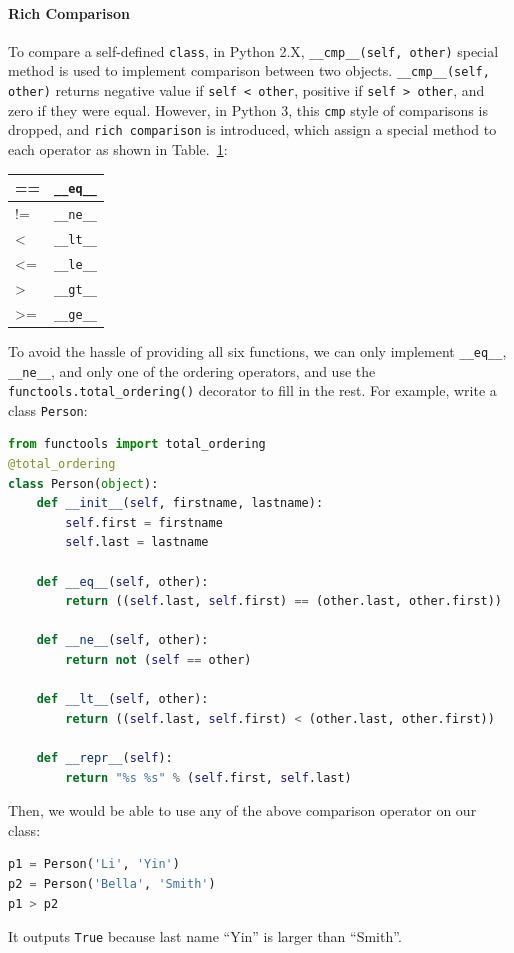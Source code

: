 \documentclass[../main.tex]{subfiles}
\begin{document}
\paragraph{Rich Comparison} To compare a self-defined \texttt{class}, in Python 2.X, \texttt{\_\_cmp\_\_(self, other)} special method is used to implement comparison between two objects. \texttt{\_\_cmp\_\_(self, other)} returns negative value if \texttt{self < other}, positive if \texttt{self > other}, and zero if they were equal. However, in Python 3, this \texttt{cmp} style of comparisons is dropped, and \texttt{rich comparison} is introduced, which assign a special method to each operator as shown in Table.~\ref{tab:comparison_operator_special_method}: 
\begin{table}[h]
\begin{small}
\centering
\noindent{}
 \noindent \begin{tabular}{|p{}|p{}|}
 \hline
== & \texttt{\_\_eq\_\_} \\ \hline
!= &\texttt{\_\_ne\_\_}\\ \hline
< 	& \texttt{\_\_lt\_\_}\\ \hline
<= &\texttt{\_\_le\_\_}\\ \hline
> 	& \texttt{\_\_gt\_\_}\\ \hline
>= 	& \texttt{\_\_ge\_\_}\\ \hline
\end{tabular}
  \label{tab:comparison_operator_special_method}
  \end{small}
\end{table} 
To avoid the hassle of providing all six functions, we can only implement \texttt{\_\_eq\_\_}, \texttt{\_\_ne\_\_}, and only one of the ordering operators, and use the \texttt{functools.total\_ordering()} decorator to fill in the rest. For example, write a class \texttt{Person}:
\begin{lstlisting}[language=Python]
from functools import total_ordering
@total_ordering
class Person(object):
    def __init__(self, firstname, lastname):
        self.first = firstname
        self.last = lastname

    def __eq__(self, other):
        return ((self.last, self.first) == (other.last, other.first))
        
    def __ne__(self, other):
        return not (self == other)

    def __lt__(self, other):
        return ((self.last, self.first) < (other.last, other.first))

    def __repr__(self):
        return "%s %s" % (self.first, self.last)
\end{lstlisting}
Then, we would be able to use any of the above comparison operator on our class:
\begin{lstlisting}[language=Python]
p1 = Person('Li', 'Yin')
p2 = Person('Bella', 'Smith')
p1 > p2
\end{lstlisting}
It outputs \texttt{True} because last name ``Yin'' is larger than ``Smith''.
\end{document}
